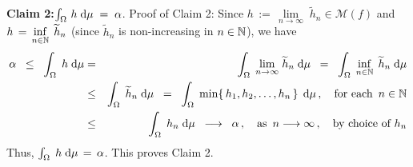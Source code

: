 \vskip 0.8cm
\noindent
\textbf{Claim 2:}\quad $\int_{\Omega}\, h \; \textnormal{d}\mu \; = \; \alpha$.
\vskip 0.1cm
\noindent
Proof of Claim 2:\;\;
Since $h \,:=\, \underset{n\rightarrow\infty}{\lim}\;\widetilde{h}_{n} \in \mathcal{M}(f)$ and
$h \,=\, \underset{n\in\mathbb{N}}{\inf}\;\,\widetilde{h}_{n}$ (since $\widetilde{h}_{n}$ is non-increasing in $n \in \mathbb{N}$),
we have
\begin{eqnarray*}
\alpha
\;\;\leq\;\;
	\int_{\Omega}\;h\;\textnormal{d}\mu
&=&
	\int_{\Omega}\;\underset{n\rightarrow\infty}{\lim}\;\widetilde{h}_{n}\;\textnormal{d}\mu
\;\;=\;\;
	\int_{\Omega}\;\underset{n\in\mathbb{N}}{\inf}\;\,\widetilde{h}_{n}\;\textnormal{d}\mu
\\
&\leq&
	\int_{\Omega}\;\widetilde{h}_{n}\;\textnormal{d}\mu
\;\;=\;\;
	\int_{\Omega}\;\min\!\left\{\,h_{1},h_{2},\ldots,h_{n}\,\right\}\;\textnormal{d}\mu\,,
	\quad\textnormal{for each \,$n \in \mathbb{N}$}
\\
&\leq&
	\int_{\Omega}\;h_{n}\;\textnormal{d}\mu
\;\;\longrightarrow\;\;
	\alpha\,,
	\quad\textnormal{as \,$n \longrightarrow \infty$}\,,
	\quad\textnormal{by choice of $h_{n}$}
\end{eqnarray*}
Thus, \;$\int_{\Omega}\;h\;\textnormal{d}\mu \,=\, \alpha$.\; This proves Claim 2.

